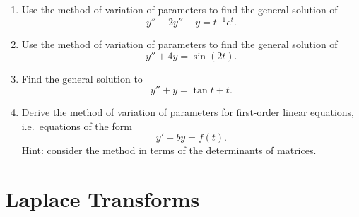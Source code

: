 \documentclass[10pt,driverfallback=hypertex]{report}
\begin{document}
\begin{enumerate}

\item Use the method of variation of parameters to find the general solution of
  \begin{dmath*}
  y'' - 2 y'' + y = t^{-1} e^t.
  \end{dmath*}

\item Use the method of variation of parameters to find the general solution of
  \begin{dmath*}
  y'' + 4y = \sin(2t).
  \end{dmath*}

\item
  Find the general solution to
  \begin{dmath*}
  y'' + y = \tan t + t.
  \end{dmath*}

\item
  Derive the method of variation of parameters for first-order linear
  equations, i.e.\ equations of the form
  \begin{dmath*}
  y' + by = f(t).
  \end{dmath*}
  Hint: consider the method in terms of the determinants of matrices.

\end{enumerate}


\chapter{Laplace Transforms}
\newpage
\end{document}

